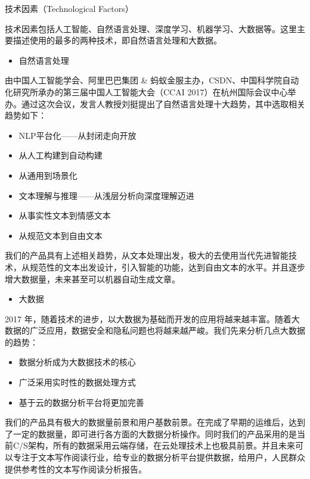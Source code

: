 \documentclass[10pt,letterpaper]{article}
\begin{document}
技术因素（Technological Factors）

技术因素包括人工智能、自然语言处理、深度学习、机器学习、大数据等。这里主要描述使用的最多的两种技术，即自然语言处理和大数据。

\begin{itemize}
\item 自然语言处理
\end{itemize}

由中国人工智能学会、阿里巴巴集团 \& 蚂蚁金服主办，CSDN、中国科学院自动化研究所承办的第三届中国人工智能大会（CCAI 2017）在杭州国际会议中心举办。通过这次会议，发言人教授刘挺提出了自然语言处理十大趋势，其中选取相关趋势如下：

\begin{itemize}
\item NLP平台化——从封闭走向开放
\item 从人工构建到自动构建
\item 从通用到场景化
\item 文本理解与推理——从浅层分析向深度理解迈进
\item 从事实性文本到情感文本
\item 从规范文本到自由文本
\end{itemize}

我们的产品具有上述相关趋势，从文本处理出发，极大的去使用当代先进智能技术，从规范性的文本出发设计，引入智能的功能，达到自由文本的水平。并且逐步增大数据量，未来甚至可以机器自动生成文章。

\begin{itemize}
\item 大数据
\end{itemize}

2017 年，随着技术的进步，以大数据为基础而开发的应用将越来越丰富。随着大数据的广泛应用，数据安全和隐私问题也将越来越严峻。我们先来分析几点大数据的趋势：

\begin{itemize}
\item 数据分析成为大数据技术的核心
\item 广泛采用实时性的数据处理方式
\item 基于云的数据分析平台将更加完善
\end{itemize}

我们的产品具有极大的数据量前景和用户基数前景。在完成了早期的运维后，达到了一定的数据量，即可进行各方面的大数据分析操作。同时我们的产品采用的是当前C/S架构，所有的数据采用云端存储，在云处理技术上也极具前景。并且未来可以专注于文本写作阅读行业，给专业的数据分析平台提供数据，给用户，人民群众提供参考性的文本写作阅读分析报告。
\end{document}
